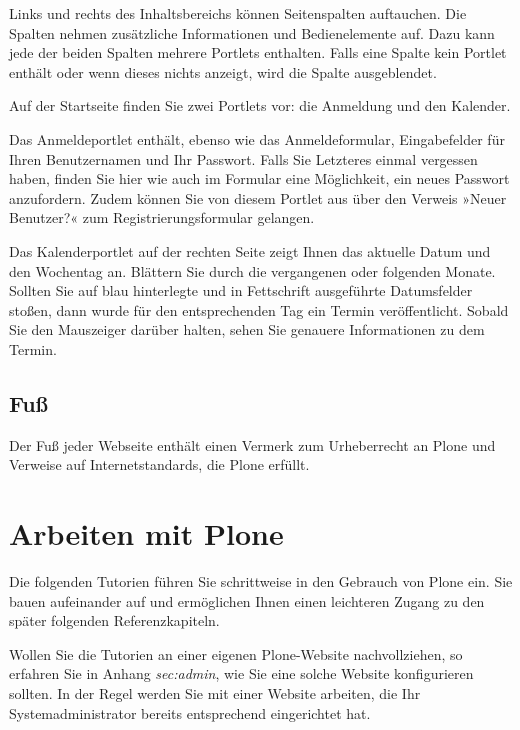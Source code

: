 \documentclass[a4paper,12pt,ngerman]{manual}
\begin{document}
Links und rechts des Inhaltsbereichs können Seitenspalten auftauchen. Die
Spalten nehmen zusätzliche Informationen und Bedienelemente auf.
Dazu kann jede der beiden Spalten mehrere Portlets
enthalten. Falls eine Spalte kein Portlet enthält oder wenn dieses nichts
anzeigt, wird die Spalte ausgeblendet.

Auf der Startseite finden Sie zwei Portlets vor: die Anmeldung und den
Kalender.

Das Anmeldeportlet enthält, ebenso wie das Anmeldeformular, Eingabefelder für
Ihren Benutzernamen und Ihr Passwort. Falls Sie Letzteres einmal vergessen
haben, finden Sie hier wie auch im Formular eine Möglichkeit, ein neues
Passwort anzufordern. Zudem können Sie von diesem Portlet aus über den Verweis
»Neuer Benutzer?« zum Registrierungsformular gelangen.

Das Kalenderportlet auf der rechten Seite zeigt Ihnen das aktuelle Datum und
den Wochentag an. Blättern Sie durch die vergangenen oder folgenden
Monate. Sollten Sie auf blau hinterlegte und in Fettschrift ausgeführte
Datumsfelder stoßen, dann wurde für den entsprechenden Tag ein Termin
veröffentlicht. Sobald Sie den Mauszeiger darüber halten, sehen Sie genauere
Informationen zu dem Termin.


\section{Fuß}

Der Fuß jeder Webseite enthält einen Vermerk zum Urheberrecht an Plone und
Verweise auf Internetstandards, die Plone erfüllt.

\resetcurrentobjects
\hypertarget{--doc-tutorien/tutorien}{}

\hypertarget{sec-tutorien}{}\chapter{Arbeiten mit Plone}

Die folgenden Tutorien führen Sie schrittweise in den Gebrauch von
Plone ein. Sie bauen aufeinander auf und ermöglichen Ihnen einen
leichteren Zugang zu den später folgenden Referenzkapiteln.

Wollen Sie die Tutorien an einer eigenen Plone-Website nachvollziehen, so
erfahren Sie in Anhang \emph{sec:admin}, wie Sie eine solche Website
konfigurieren sollten. In der Regel werden Sie mit einer Website arbeiten, die
Ihr Systemadministrator bereits entsprechend eingerichtet hat.
\end{document}
